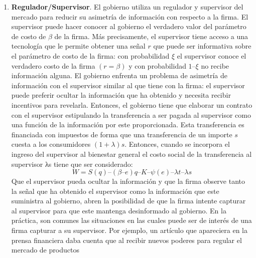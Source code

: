 \documentclass[
  12pt,
  spanish,
]{book}
\begin{document}
\begin{enumerate}
{    sentido, no hay problemas de principal-agente entre consumidores ya
    que los políticos representan fielmente sus intereses.} esto es de
  consumidores y la firma monopólica:
  \[W = U + V = S(q) – (β – e)q – K – ψ(e) – λt\] Para ello el gobierno
  utiliza contratos con la firma que estipulan el costo marginal
  \((c)\), la cantidad del producto \((q)\) y la transferencia que
  recibirá la firma \((t)\). Más precisamente, el gobierno puede
  utilizar un menú de contratos diseñados para cada tipo de firma:
  \((\underline c, \underline q, \underline t )\) para la firma
  eficiente y para \((\overline c, \overline q, \overline t)\) para la
  firma ineficiente.
\item
  \textbf{Regulador/Supervisor}. El gobierno utiliza un regulador y
  supervisor del mercado para reducir su asimetría de información con
  respecto a la firma. El supervisor puede hacer conocer al gobierno el
  verdadero valor del parámetro de costo de \(β\) de la firma. Más
  precisamente, el supervisor tiene acceso a una tecnología que le
  permite obtener una señal \(r\) que puede ser informativa sobre el
  parámetro de costo de la firma: con probabilidad \(ξ\) el supervisor
  conoce el verdadero costo de la firma \((r = β)\) y con probabilidad
  \(1 – ξ\) no recibe información alguna. El gobierno enfrenta un
  problema de asimetría de información con el supervisor similar al que
  tiene con la firma: el supervisor puede preferir ocultar la
  información que ha obtenido y necesita recibir incentivos para
  revelarla. Entonces, el gobierno tiene que elaborar un contrato con el
  supervisor estipulando la transferencia a ser pagada al supervisor
  como una función de la información por este proporcionada. Esta
  transferencia es financiada con impuestos de forma que una
  transferencia de un importe \(s\) cuesta a los consumidores
  \((1 + λ)s\). Entonces, cuando se incorpora el ingreso del supervisor
  al bienestar general el costo social de la transferencia al supervisor
  λs tiene que ser considerado:
  \[W = S(q) – (β – e)q – K – ψ(e) – λt – λs\] Que el supervisor pueda
  ocultar la información y que la firma observe tanto la señal que ha
  obtenido el supervisor como la información que este suministra al
  gobierno, abren la posibilidad de que la firma intente capturar al
  supervisor para que este mantenga desinformado al gobierno. En la
  práctica, son comunes las situaciones en las cuales puede ser de
  interés de una firma capturar a su supervisor. Por ejemplo, un
  artículo que apareciera en la prensa financiera daba cuenta que al
  recibir nuevos poderes para regular el mercado de productos

\end{enumerate}
\end{document}
